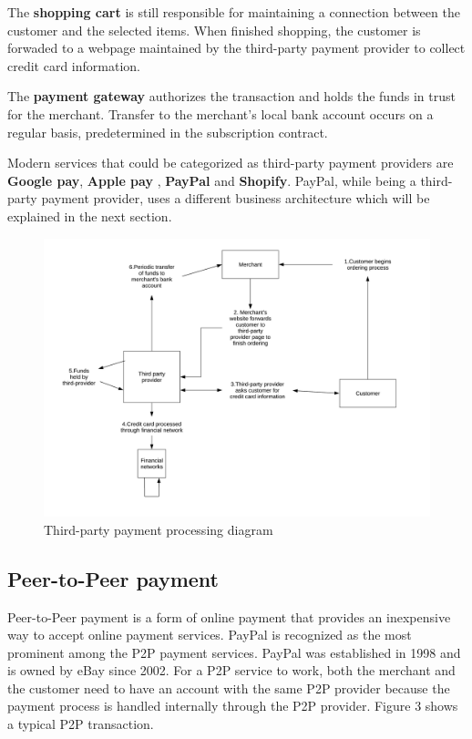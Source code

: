 \documentclass{ferseminar}
\begin{document}
The \textbf{shopping cart} is still responsible for maintaining a connection between the customer and the selected items. When finished shopping, the customer is forwaded to a webpage maintained by the third-party payment provider to collect credit card information.

The \textbf{payment gateway} authorizes the transaction and holds the funds in trust for the merchant. Transfer to the merchant's local bank account occurs on a regular basis, predetermined in the subscription contract.

Modern services that could be categorized as third-party payment providers are \textbf{Google pay}, \textbf{Apple pay} \cite{Google}, \textbf{PayPal} and \textbf{Shopify}. PayPal, while being a third-party payment provider, uses a different business architecture which will be explained in the next section.

\begin{figure}[ht]
	\caption{Third-party payment processing diagram}
	\includegraphics[scale=0.26]{diagram2}
	\centering
\end{figure}
\FloatBarrier

\subsection{Peer-to-Peer payment}

Peer-to-Peer payment is a form of online payment that provides an inexpensive way to accept online payment services. PayPal is recognized as the most prominent among the P2P payment services. PayPal was established in 1998 and is owned by eBay since 2002. For a P2P service to work, both the merchant and the customer need to have an account with the same P2P provider because the payment process is handled internally through the P2P provider. Figure 3 shows a typical P2P transaction.
\end{document}
